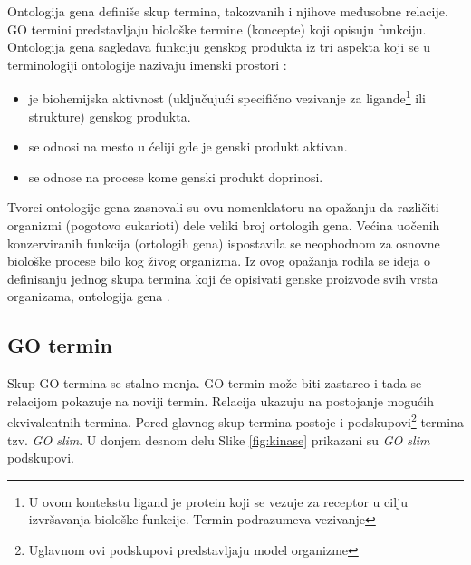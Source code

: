 Ontologija gena definiše skup termina, takozvanih 
 i njihove međusobne relacije. GO termini predstavljaju biološke
termine (koncepte) koji opisuju funkciju. Ontologija gena sagledava funkciju
genskog produkta iz tri aspekta koji se u terminologiji ontologije nazivaju
imenski prostori :
\begin{itemize}
  \item {} je biohemijska aktivnost (uključujući
    specifično vezivanje za ligande\footnote{
      U ovom kontekstu ligand je protein koji se vezuje za receptor u cilju
      izvršavanja biološke funkcije. Termin podrazumeva vezivanje 
    } ili strukture) genskog produkta.
  \item {} se odnosi na mesto u ćeliji gde je
    genski produkt aktivan.
  \item {} se odnose na procese kome genski produkt
    doprinosi.
\end{itemize}

Tvorci ontologije gena zasnovali su ovu nomenklatoru na opažanju da različiti
organizmi (pogotovo eukarioti) dele veliki broj ortologih gena. Većina uočenih
konzerviranih funkcija (ortologih gena) ispostavila se neophodnom za osnovne
biološke procese bilo kog živog organizma.  Iz ovog opažanja rodila se ideja o
definisanju jednog skupa termina koji će opisivati genske proizvode svih vrsta
organizama, ontologija gena \parencite{GO2000}.


\subsection{GO termin}

Skup GO termina se stalno menja. GO termin može biti zastareo i tada se
relacijom  pokazuje na noviji termin. Relacija
 ukazuju na postojanje mogućih ekvivalentnih termina. Pored
glavnog skup termina postoje i podskupovi\footnote{Uglavnom ovi podskupovi
predstavljaju model organizme} termina tzv. \textit{GO slim}. U donjem desnom
delu Slike \ref{fig:kinase} prikazani su \textit{GO slim} podskupovi.

